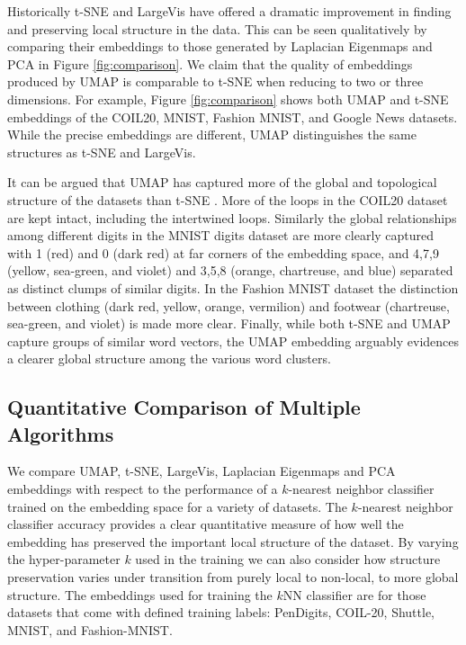 \documentclass[12pt]{article}
\begin{document}

Historically t-SNE and LargeVis have offered a dramatic improvement in finding and preserving local structure in the data.  This can be seen qualitatively by comparing their embeddings to those generated by Laplacian Eigenmaps and PCA in Figure \ref{fig:comparison}.   We claim that the quality of embeddings produced by UMAP is comparable to t-SNE when reducing to two or three dimensions. For example, Figure \ref{fig:comparison} shows both UMAP and t-SNE embeddings of the COIL20, MNIST, Fashion MNIST, and Google News datasets. While the precise embeddings are different, UMAP distinguishes the same structures as t-SNE and LargeVis.

It can be argued that UMAP has captured more of the global and topological structure of the datasets than t-SNE \cite{Becht298430, wu2019comparison}. More of the loops in the COIL20 dataset are kept intact, including the intertwined loops. Similarly the global relationships among different digits in the MNIST digits dataset are more clearly captured with 1 (red) and 0 (dark red) at far corners of the embedding space, and 4,7,9 (yellow, sea-green, and violet) and 3,5,8 (orange, chartreuse, and blue) separated as distinct clumps of similar digits. In the Fashion MNIST dataset the distinction between clothing (dark red, yellow, orange, vermilion) and footwear (chartreuse, sea-green, and violet) is made more clear. Finally, while both t-SNE and UMAP capture groups of similar word vectors, the UMAP embedding arguably evidences a clearer global structure among the various word clusters.

\subsection{Quantitative Comparison of Multiple Algorithms}

We compare UMAP, t-SNE, LargeVis, Laplacian Eigenmaps and PCA embeddings with respect to the performance of a $k$-nearest neighbor classifier trained on the embedding space for a variety of datasets. The $k$-nearest neighbor classifier accuracy provides a clear quantitative measure of how well the embedding has preserved the important local structure of the dataset. By varying the hyper-parameter $k$ used in the training we can also consider how structure preservation varies under transition from purely local to non-local, to more global structure. The embeddings used for training the $k$NN classifier are for those datasets that come with defined training labels: PenDigits, COIL-20, Shuttle, MNIST, and Fashion-MNIST.
\end{document}
